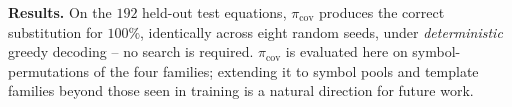 \textbf{Results.}
On the $192$ held-out test equations, $\pi_{\mathrm{cov}}$ produces the
correct substitution for \textbf{$100\%$}, identically across eight random
seeds, under \emph{deterministic} greedy decoding -- no search is required.
$\pi_{\mathrm{cov}}$ is evaluated here on symbol-permutations of the four
families; extending it to symbol pools and template families beyond those
seen in training is a natural direction for future work.

